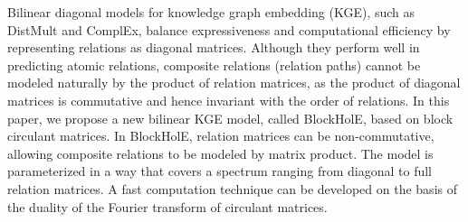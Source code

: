 Bilinear diagonal models for knowledge graph
embedding (KGE), such as DistMult and ComplEx, balance expressiveness and computational efficiency by representing relations as diagonal matrices. Although they perform well in predicting atomic relations, composite relations (relation paths) cannot be modeled naturally by the product of relation matrices, as the product of diagonal matrices is commutative and hence invariant with the order of relations. In this paper, we propose a new bilinear KGE model, called BlockHolE, based on block circulant matrices. In BlockHolE, relation matrices can be non-commutative, allowing composite relations to be modeled by matrix product. The model is parameterized in a way that covers a spectrum ranging from diagonal to full relation matrices. A fast computation technique can be developed on the basis of the duality of the Fourier transform of circulant matrices.